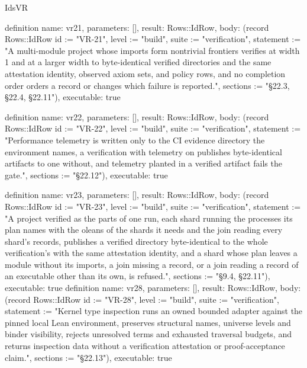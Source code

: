 \begin{lexlean}{IdsVR}
\begin{semanticmodule}
definition{
  name: vr21,
  parameters: [],
  result: Rows::IdRow,
  body: (record Rows::IdRow {id := "VR-21", level := "build", suite := "verification", statement := "A multi-module project whose imports form nontrivial frontiers verifies at width 1 and at a larger width to byte-identical verified directories and the same attestation identity, observed axiom sets, and policy rows, and no completion order orders a record or changes which failure is reported.", sections := "§22.3, §22.4, §22.11"}),
  executable: true
}

definition{
  name: vr22,
  parameters: [],
  result: Rows::IdRow,
  body: (record Rows::IdRow {id := "VR-22", level := "build", suite := "verification", statement := "Performance telemetry is written only to the CI evidence directory the environment names, a verification with telemetry on publishes byte-identical artifacts to one without, and telemetry planted in a verified artifact fails the gate.", sections := "§22.12"}),
  executable: true
}

definition{
  name: vr23,
  parameters: [],
  result: Rows::IdRow,
  body: (record Rows::IdRow {id := "VR-23", level := "build", suite := "verification", statement := "A project verified as the parts of one run, each shard running the processes its plan names with the oleans of the shards it needs and the join reading every shard's records, publishes a verified directory byte-identical to the whole verification's with the same attestation identity, and a shard whose plan leaves a module without its imports, a join missing a record, or a join reading a record of an executable other than its own, is refused.", sections := "§9.4, §22.11"}),
  executable: true
}
definition{
  name: vr28,
  parameters: [],
  result: Rows::IdRow,
  body: (record Rows::IdRow {id := "VR-28", level := "build", suite := "verification", statement := "Kernel type inspection runs an owned bounded adapter against the pinned local Lean environment, preserves structural names, universe levels and binder visibility, rejects unresolved terms and exhausted traversal budgets, and returns inspection data without a verification attestation or proof-acceptance claim.", sections := "§22.13"}),
  executable: true
}
\end{semanticmodule}
\end{lexlean}
